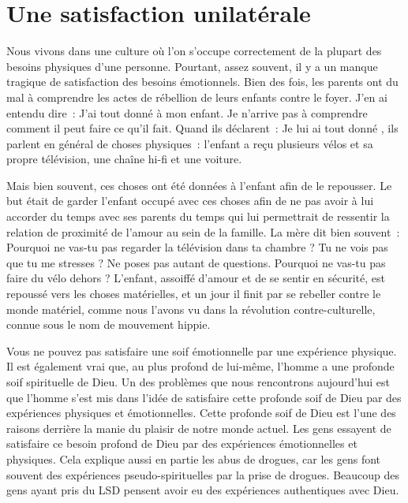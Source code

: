 \section{Une satisfaction unilat\'erale}

Nous vivons dans une culture où l'on s'occupe correctement de la plupart
 des besoins physiques d'une personne. Pourtant, assez souvent,
 il y a un manque tragique de satisfaction des besoins émotionnels.
 Bien des fois, les parents ont du mal à comprendre les actes de rébellion
 de leurs enfants contre le foyer. J'en ai entendu dire~:
 \og J'ai tout donné à mon enfant. Je n'arrive pas à comprendre
 comment il peut faire ce qu'il fait. \fg{}
 Quand ils déclarent~: \og Je lui ai tout donné \fg{}, ils parlent en général
 de choses physiques~: l'enfant a reçu plusieurs vélos
 et sa propre télévision, une chaîne hi-fi et une voiture.

Mais bien souvent, ces choses ont été données à l'enfant afin de le repousser.
 Le but était de garder l'enfant occupé avec ces choses afin de ne pas avoir
 à lui accorder du temps avec ses parents
 \ocadr du temps qui lui permettrait de ressentir la relation de proximité
 de l'amour au sein de la famille. La mère dit bien souvent~:
 \og Pourquoi ne vas-tu pas regarder la télévision dans ta chambre ?
 Tu ne vois pas que tu me stresses ? Ne poses pas autant de questions.
 Pourquoi ne vas-tu pas faire du vélo dehors ? \fg{}
 L'enfant, assoiffé d'amour et de se sentir en sécurité,
 est repoussé vers les choses matérielles, et un jour il finit
 par se rebeller contre le monde matériel, comme nous l'avons vu
 dans la révolution contre-culturelle, connue sous le nom de mouvement hippie.

\pagebreak

Vous ne pouvez pas satisfaire une soif émotionnelle par une \linebreak
 expérience physique. Il est également vrai que, au plus profond de lui-même,
 l'homme a une profonde soif spirituelle de Dieu.
 Un des problèmes que nous rencontrons aujourd'hui est que l'homme
 s'est mis dans l'idée de satisfaire cette profonde soif de Dieu
 par des expériences physiques et émotionnelles.
 Cette profonde soif de Dieu est l'une des raisons derrière la manie
 du plaisir de notre monde actuel. Les gens essayent de satisfaire
 ce besoin profond de Dieu par des expériences émotionnelles et physiques.
 Cela explique aussi en partie les abus de drogues,
 car les gens font souvent des expériences pseudo-spirituelles
 par la prise de drogues. Beaucoup des gens ayant pris du LSD
 pensent avoir eu des expériences authentiques avec Dieu.


